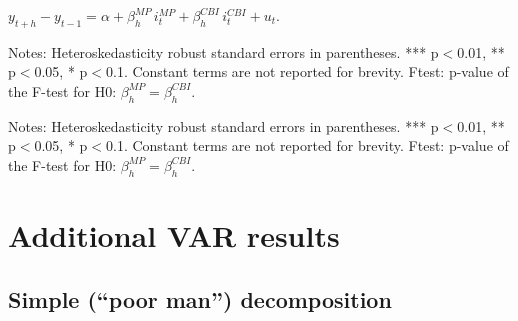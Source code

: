 \documentclass[a4paper,12pt]{article}
\newcommand{\pathTables}{tables/}
\begin{document}

\begin{table}[!htbp]
\begin{center}
\caption{The effect of Fed monetary policy and information shocks on financial variables}\label{tab: reg fed shocks}
$y^{}_{t+h}-y^{}_{t-1} = \alpha + \beta^{MP}_h\, i^{MP}_t + \beta^{CBI}_h\, i^{CBI}_t + u_t.$
\small
{}
\end{center}\footnotesize
Notes: Heteroskedasticity robust standard errors in parentheses. *** p$<$0.01, ** p$<$0.05, * p$<$0.1.
Constant terms are not reported for brevity.
Ftest: p-value of the F-test for H0: $\beta^{MP}_h=\beta^{CBI}_h$.
\end{table}

\begin{table}[!htbp]\addtocounter{table}{-1}\small
\begin{center}
\caption{Continued}
\end{center}\footnotesize
Notes: Heteroskedasticity robust standard errors in parentheses. *** p$<$0.01, ** p$<$0.05, * p$<$0.1.
Constant terms are not reported for brevity.
Ftest: p-value of the F-test for H0: $\beta^{MP}_h=\beta^{CBI}_h$.
\end{table}


\clearpage

\section{Additional VAR results}\label{sec: app var}

\subsection{Simple (``poor man'') decomposition}
\end{document}
